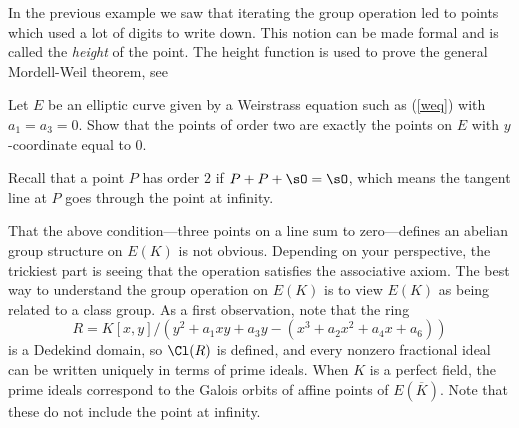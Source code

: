 \begin{remark}
  In the previous example we saw that iterating the
  group operation led to points which used a lot of digits
  to write down. This notion can be made formal and is called
  the \emph{height} of the point. The height function is used
  to prove the general Mordell-Weil theorem, see
  \cite[Ch.~VIII.4]{silverman:aec}
\end{remark}

\begin{exercise}\label{ex:ec2torsion}
  Let $E$ be an elliptic curve given by a
  Weirstrass equation such as (\ref{weq}) with $a_1=a_3=0$.
  Show that the points of order two are exactly
  the points on $E$ with $y$-coordinate equal to
  $0$.
  
  \begin{hint}
    Recall that a point $P$ has order $2$ if
    $P + P + \sO = \sO$, which means the tangent line
    at $P$ goes through the point at infinity.
  \end{hint}
\end{exercise}

That the above condition---three points on a line sum to
zero---defines an abelian group structure on $E(K)$ is not obvious.
Depending on your perspective, the trickiest part is seeing that the
operation satisfies the associative axiom.  The best way to understand
the group operation on $E(K)$ is to view $E(K)$ as being related to a
class group.  As a first observation, note that the ring
\[
  R = K[x,y]/(y^2 +a_1 xy + a_3 y - (x^3 + a_2 x^2 + a_4 x + a_6))
\]
is a Dedekind domain, so $\Cl(R)$ is defined, and every nonzero
fractional ideal can be written uniquely in terms of prime ideals.
When $K$ is a perfect field, the prime ideals correspond to the Galois
orbits of affine points of $E(\overline{K})$.
Note that these do not include the point at infinity.

